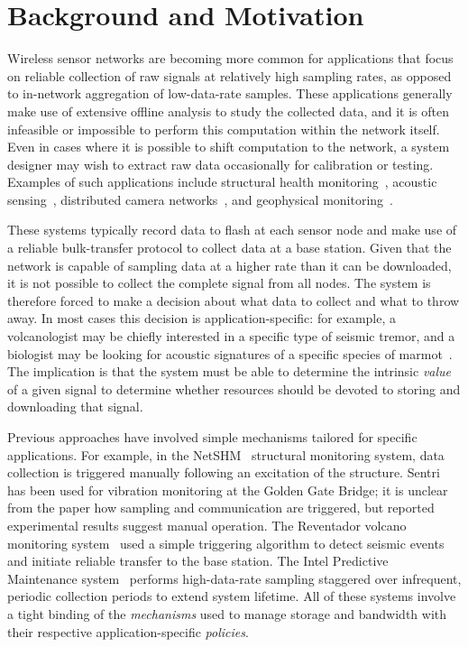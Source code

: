 \section{Background and Motivation}
\label{sec-motivation}


Wireless sensor networks are becoming more common for applications
that focus on reliable collection of raw signals at relatively high sampling
rates, as opposed to in-network aggregation of low-data-rate samples.
These applications generally make use of extensive offline analysis 
to study the collected data, and it is often infeasible
or impossible to perform this computation within the network itself.
Even in cases where it is possible to shift computation to the network, a
system designer may wish to extract raw data occasionally for calibration
or testing.  Examples of such applications include structural health
monitoring~\cite{netshm-spots06,ggb-ipsn07,wimms-lynch06}, acoustic
sensing~\cite{vango,vigilnet,girod-ipsn07,enviromic}, distributed camera
networks~\cite{cyclops}, and geophysical monitoring~\cite{volcano-osdi06}.

These systems typically record data to flash at each sensor node 
and make use of a reliable bulk-transfer protocol to collect data at 
a base station. Given that the network is capable of sampling data at
a higher rate than it can be downloaded, it is not possible to 
collect the complete signal from all nodes. 
The system is therefore forced to make
a decision about what data to collect and what to throw away. In most
cases this decision is application-specific: for example, a
volcanologist may be chiefly interested in a specific type of seismic
tremor, and a biologist may be looking for acoustic signatures of a 
specific species of marmot~\cite{girod-ipsn07}. The implication is that
the system must be able to determine the intrinsic {\em value} of
a given signal to determine whether resources should be devoted to 
storing and downloading that signal.

Previous approaches have involved simple mechanisms tailored for 
specific applications. For example, in the
NetSHM~\cite{netshm-spots06,netshm-emnets05} structural monitoring 
system, data collection is 
triggered manually following an excitation of the structure.
Sentri~\cite{ggb-ipsn07} has been used for vibration monitoring at
the Golden Gate Bridge; it is unclear from the paper how sampling and
communication are triggered, but reported experimental results
suggest manual operation. The Reventador volcano monitoring 
system~\cite{volcano-osdi06} used a simple triggering algorithm to detect 
seismic events and initiate reliable transfer to the base station. 
The Intel Predictive Maintenance
system~\cite{intel-northseasensys} performs high-data-rate sampling
staggered over infrequent, periodic collection periods to extend
system lifetime. 
All of these systems involve a tight binding of the {\em mechanisms} 
used to manage storage and bandwidth with their respective 
application-specific {\em policies}.

